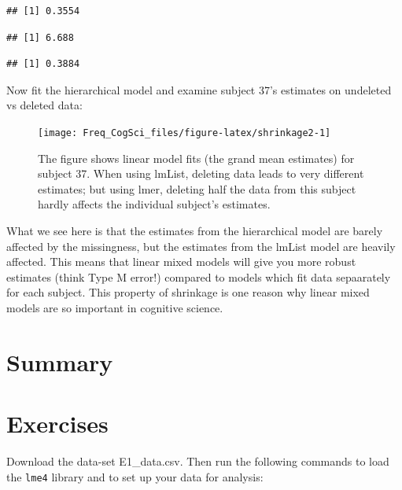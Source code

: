 \documentclass[12pt,]{krantz}
\newenvironment{Shaded}{\begin{snugshade}}{\end{snugshade}}
\newcommand{\CommentTok}[1]{\textcolor[rgb]{0.56,0.35,0.01}{\textit{#1}}}
\newcommand{\DataTypeTok}[1]{\textcolor[rgb]{0.13,0.29,0.53}{#1}}
\newcommand{\DecValTok}[1]{\textcolor[rgb]{0.00,0.00,0.81}{#1}}
\newcommand{\KeywordTok}[1]{\textcolor[rgb]{0.13,0.29,0.53}{\textbf{#1}}}
\newcommand{\NormalTok}[1]{#1}
\newcommand{\OperatorTok}[1]{\textcolor[rgb]{0.81,0.36,0.00}{\textbf{#1}}}
\newcommand{\OtherTok}[1]{\textcolor[rgb]{0.56,0.35,0.01}{#1}}
\newcommand{\StringTok}[1]{\textcolor[rgb]{0.31,0.60,0.02}{#1}}
\begin{document}
\begin{verbatim}
## [1] 0.3554
\end{verbatim}

\begin{verbatim}
## [1] 6.688
\end{verbatim}

\begin{verbatim}
## [1] 0.3884
\end{verbatim}

Now fit the hierarchical model and examine subject 37's estimates on undeleted vs deleted data:

\begin{figure}
\texttt{[image: Freq\_CogSci\_files/figure-latex/shrinkage2-1]} \caption{The figure shows linear model fits (the grand mean estimates) for subject 37. When using lmList, deleting data leads to very different estimates; but using lmer, deleting half the data from this subject hardly affects the individual subject's estimates.}\label{fig:shrinkage2}
\end{figure}

What we see here is that the estimates from the hierarchical model are barely affected by the missingness, but the estimates from the lmList model are heavily affected.
This means that linear mixed models will give you more robust estimates (think Type M error!) compared to models which fit data sepaarately for each subject. This property of shrinkage is one reason why linear mixed models are so important in cognitive science.

\hypertarget{summary}{%
\section{Summary}\label{summary}}

\hypertarget{sec:LMExercises1}{%
\section{Exercises}\label{sec:LMExercises1}}

Download the data-set E1\_data.csv. Then run the following commands to load the \texttt{lme4} library and to set up your data for analysis:

\begin{Shaded}
\end{Shaded}
\end{document}
